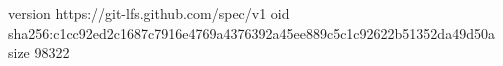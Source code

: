 version https://git-lfs.github.com/spec/v1
oid sha256:c1cc92ed2c1687c7916e4769a4376392a45ee889c5c1c92622b51352da49d50a
size 98322
